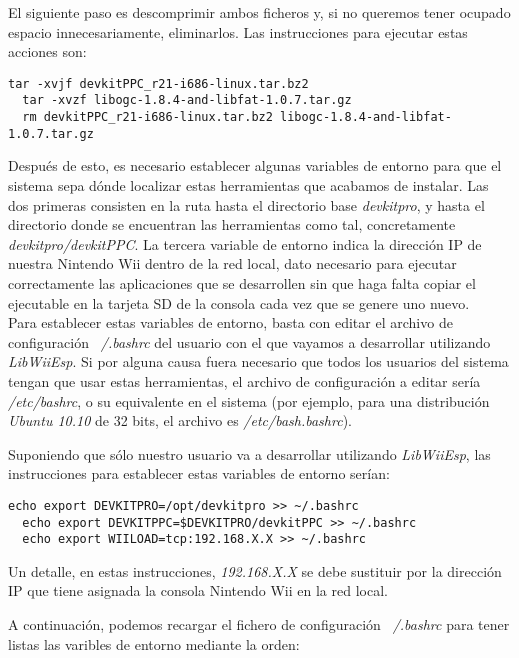 El siguiente paso es descomprimir ambos ficheros y, si no queremos tener ocupado espacio innecesariamente, eliminarlos. Las instrucciones para ejecutar estas acciones son:

\begin{lstlisting}[style=consola]
  tar -xvjf devkitPPC_r21-i686-linux.tar.bz2
  tar -xvzf libogc-1.8.4-and-libfat-1.0.7.tar.gz
  rm devkitPPC_r21-i686-linux.tar.bz2 libogc-1.8.4-and-libfat-1.0.7.tar.gz
\end{lstlisting}

Después de esto, es necesario establecer algunas variables de entorno para que el sistema sepa dónde localizar estas herramientas que acabamos de instalar. Las dos primeras consisten en la ruta hasta el directorio base \emph{devkitpro}, y hasta el directorio donde se encuentran las herramientas como tal, concretamente \emph{devkitpro/devkitPPC}. La tercera variable de entorno indica la dirección IP de nuestra Nintendo Wii dentro de la red local, dato necesario para ejecutar correctamente las aplicaciones que se desarrollen sin que haga falta copiar el ejecutable en la tarjeta SD de la consola cada vez que se genere uno nuevo. \\

Para establecer estas variables de entorno, basta con editar el archivo de configuración \emph{~/.bashrc} del usuario con el que vayamos a desarrollar utilizando \emph{LibWiiEsp}. Si por alguna causa fuera necesario que todos los usuarios del sistema tengan que usar estas herramientas, el archivo de configuración a editar sería \emph{/etc/bashrc}, o su equivalente en el sistema (por ejemplo, para una distribución \emph{Ubuntu 10.10} de 32 bits, el archivo es \emph{/etc/bash.bashrc}).

Suponiendo que sólo nuestro usuario va a desarrollar utilizando \emph{LibWiiEsp}, las instrucciones para establecer estas variables de entorno serían:

\begin{lstlisting}[style=consola]
  echo export DEVKITPRO=/opt/devkitpro >> ~/.bashrc
  echo export DEVKITPPC=$DEVKITPRO/devkitPPC >> ~/.bashrc
  echo export WIILOAD=tcp:192.168.X.X >> ~/.bashrc
\end{lstlisting}

Un detalle, en estas instrucciones, \emph{192.168.X.X} se debe sustituir por la dirección IP que tiene asignada la consola Nintendo Wii en la red local.

A continuación, podemos recargar el fichero de configuración \emph{~/.bashrc} para tener listas las varibles de entorno mediante la orden:

